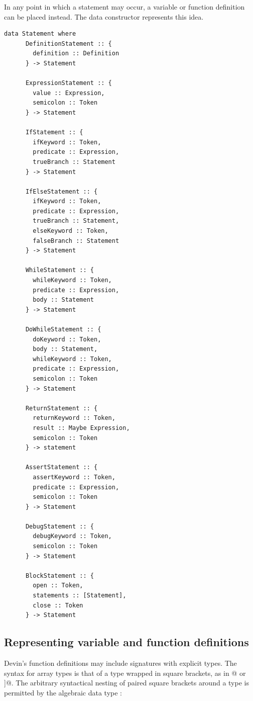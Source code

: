 \documentclass[UdineBachThesis,american,11pt,draft]{PhdThesis}
\begin{document}
  In any point in which a statement may occur, a variable or function definition
  can be placed instead. The data constructor \lstinline@DefinitionStatement@
  represents this idea.

  \begin{lstlisting}[gobble=4,basicstyle=\ttfamily\small]
    data Statement where
      DefinitionStatement :: {
        definition :: Definition
      } -> Statement

      ExpressionStatement :: {
        value :: Expression,
        semicolon :: Token
      } -> Statement

      IfStatement :: {
        ifKeyword :: Token,
        predicate :: Expression,
        trueBranch :: Statement
      } -> Statement

      IfElseStatement :: {
        ifKeyword :: Token,
        predicate :: Expression,
        trueBranch :: Statement,
        elseKeyword :: Token,
        falseBranch :: Statement
      } -> Statement

      WhileStatement :: {
        whileKeyword :: Token,
        predicate :: Expression,
        body :: Statement
      } -> Statement

      DoWhileStatement :: {
        doKeyword :: Token,
        body :: Statement,
        whileKeyword :: Token,
        predicate :: Expression,
        semicolon :: Token
      } -> Statement

      ReturnStatement :: {
        returnKeyword :: Token,
        result :: Maybe Expression,
        semicolon :: Token
      } -> statement

      AssertStatement :: {
        assertKeyword :: Token,
        predicate :: Expression,
        semicolon :: Token
      } -> Statement

      DebugStatement :: {
        debugKeyword :: Token,
        semicolon :: Token
      } -> Statement

      BlockStatement :: {
        open :: Token,
        statements :: [Statement],
        close :: Token
      } -> Statement
  \end{lstlisting}

  \subsection{Representing variable and function definitions}

  Devin's function definitions may include signatures with explicit types. The
  syntax for array types is that of a type wrapped in square brackets, as in
  \lstinline@[Int]@ or \lstinline@[[Float]]@. The arbitrary syntactical nesting
  of paired square brackets around a type is permitted by the algebraic data
  type \lstinline@TypeId@:
\end{document}
